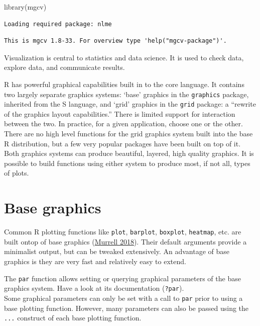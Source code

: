 \documentclass[
]{book}
\newenvironment{Shaded}{\begin{snugshade}}{\end{snugshade}}
\newcommand{\FunctionTok}[1]{\textcolor[rgb]{0.00,0.00,0.00}{#1}}
\newcommand{\NormalTok}[1]{#1}
\begin{document}
\begin{Shaded}
\begin{Highlighting}[]
\FunctionTok{library}\NormalTok{(mgcv)}
\end{Highlighting}
\end{Shaded}

\begin{verbatim}
Loading required package: nlme
\end{verbatim}

\begin{verbatim}
This is mgcv 1.8-33. For overview type 'help("mgcv-package")'.
\end{verbatim}

Visualization is central to statistics and data science. It is used to check data, explore data, and communicate results.

R has powerful graphical capabilities built in to the core language. It contains two largely separate graphics systems: `base' graphics in the \texttt{graphics} package, inherited from the S language, and `grid' graphics in the \texttt{grid} package: a ``rewrite of the graphics layout capabilities.'' There is limited support for interaction between the two. In practice, for a given application, choose one or the other. There are no high level functions for the grid graphics system built into the base R distribution, but a few very popular packages have been built on top of it. Both graphics systems can produce beautiful, layered, high quality graphics. It is possible to build functions using either system to produce most, if not all, types of plots.

\hypertarget{base-graphics}{%
\section{Base graphics}\label{base-graphics}}

Common R plotting functions like \texttt{plot}, \texttt{barplot}, \texttt{boxplot}, \texttt{heatmap}, etc. are built ontop of base graphics (\protect\hyperlink{ref-murrell2018r}{Murrell 2018}). Their default arguments provide a minimalist output, but can be tweaked extensively. An advantage of base graphics is they are very fast and relatively easy to extend.

The \texttt{par} function allows setting or querying graphical parameters of the base graphics system. Have a look at its documentation (\texttt{?par}).\\
Some graphical parameters can only be set with a call to \texttt{par} prior to using a base plotting function. However, many parameters can also be passed using the \texttt{...} construct of each base plotting function.
\end{document}

